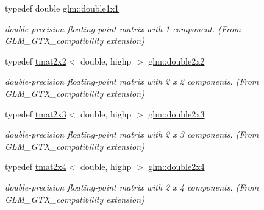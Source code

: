 \begin{DoxyCompactItemize}
\mbox{\label{group__gtx__compatibility_ga1c87d3042377335eb050a20ab0ec148a}} 
typedef double \hyperlink{group__gtx__compatibility_ga1c87d3042377335eb050a20ab0ec148a}{glm\+::double1x1}
\begin{DoxyCompactList}\small\item\em double-\/precision floating-\/point matrix with 1 component. (From G\+L\+M\+\_\+\+G\+T\+X\+\_\+compatibility extension) \end{DoxyCompactList}\item 
\mbox{\label{group__gtx__compatibility_ga7651d80f2dcc222a2e229ce44af96f11}} 
typedef \hyperlink{structglm_1_1tmat2x2}{tmat2x2}$<$ double, highp $>$ \hyperlink{group__gtx__compatibility_ga7651d80f2dcc222a2e229ce44af96f11}{glm\+::double2x2}
\begin{DoxyCompactList}\small\item\em double-\/precision floating-\/point matrix with 2 x 2 components. (From G\+L\+M\+\_\+\+G\+T\+X\+\_\+compatibility extension) \end{DoxyCompactList}\item 
\mbox{\label{group__gtx__compatibility_ga60ae0f5858d498b2e5b9bb8d23019db0}} 
typedef \hyperlink{structglm_1_1tmat2x3}{tmat2x3}$<$ double, highp $>$ \hyperlink{group__gtx__compatibility_ga60ae0f5858d498b2e5b9bb8d23019db0}{glm\+::double2x3}
\begin{DoxyCompactList}\small\item\em double-\/precision floating-\/point matrix with 2 x 3 components. (From G\+L\+M\+\_\+\+G\+T\+X\+\_\+compatibility extension) \end{DoxyCompactList}\item 
\mbox{\label{group__gtx__compatibility_gadb90656f5faac0e800718a0a19bf0e03}} 
typedef \hyperlink{structglm_1_1tmat2x4}{tmat2x4}$<$ double, highp $>$ \hyperlink{group__gtx__compatibility_gadb90656f5faac0e800718a0a19bf0e03}{glm\+::double2x4}
\begin{DoxyCompactList}\small\item\em double-\/precision floating-\/point matrix with 2 x 4 components. (From G\+L\+M\+\_\+\+G\+T\+X\+\_\+compatibility extension) \end{DoxyCompactList}\item 
\mbox{\label{group__gtx__compatibility_ga00e4b55452fdffa224a68ead4edffa5a}} 

\end{DoxyCompactItemize}
